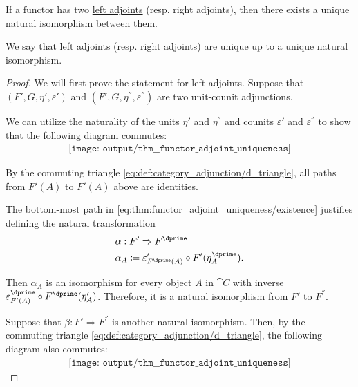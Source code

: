 \begin{proposition}\label{thm:functor_adjoint_uniqueness}
  If a functor has two \hyperref[def:category_adjunction]{left adjoints} (resp. right adjoints), then there exists a unique natural isomorphism between them.

  We say that left adjoints (resp. right adjoints) are unique up to a unique natural isomorphism.
\end{proposition}
\begin{proof}
  We will first prove the statement for left adjoints. Suppose that \( (F', G, \eta', \varepsilon') \) and \( (F', G, \eta^\dprime, \varepsilon^\dprime) \) are two unit-counit adjunctions.

   We can utilize the naturality of the units \( \eta' \) and \( \eta^\dprime \) and counits \( \varepsilon' \) and \( \varepsilon^\dprime \) to show that the following diagram commutes:
  \begin{equation}\label{eq:thm:functor_adjoint_uniqueness/existence}
    \begin{aligned}
      \texttt{[image: output/thm\_\_functor\_adjoint\_uniqueness]}
    \end{aligned}
  \end{equation}

  By the commuting triangle \eqref{eq:def:category_adjunction/d_triangle}, all paths from \( F'(A) \) to \( F'(A) \) above are identities.

  The bottom-most path in \eqref{eq:thm:functor_adjoint_uniqueness/existence} justifies defining the natural transformation
  \begin{equation*}
    \begin{aligned}
      &\alpha: F' \Rightarrow F^\dprime \\
      &\alpha_A \coloneqq \varepsilon'_{F^\dprime(A)} \bincirc F'(\eta_A^\dprime).
    \end{aligned}
  \end{equation*}

  Then \( \alpha_A \) is an isomorphism for every object \( A \) in \( \cat{C} \) with inverse \( \varepsilon_{F'(A)}^\dprime \bincirc F^\dprime(\eta_A') \). Therefore, it is a natural isomorphism from \( F' \) to \( F^\dprime \).

   Suppose that \( \beta: F' \Rightarrow F^\dprime \) is another natural isomorphism. Then, by the commuting triangle \eqref{eq:def:category_adjunction/d_triangle}, the following diagram also commutes:
  \begin{equation}\label{eq:thm:functor_adjoint_uniqueness/uniqueness}
    \begin{aligned}
      \texttt{[image: output/thm\_\_functor\_adjoint\_uniqueness]}
    \end{aligned}
  \end{equation}


\end{proof}
